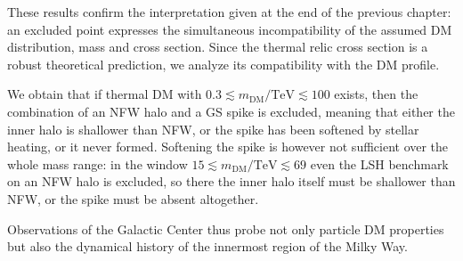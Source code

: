 These results confirm the interpretation given at the end of the previous
chapter: an excluded point expresses the simultaneous incompatibility of the assumed
DM distribution, mass and cross section. Since the thermal relic cross section
is a robust theoretical prediction, we analyze its compatibility 
with the DM profile. 

We obtain that if thermal DM with $0.3 \lesssim m_{\mathrm{DM}}/\mathrm{TeV}
\lesssim 100$ exists, then the combination of an NFW halo and a GS spike is
excluded, meaning that either the inner halo is shallower than NFW, or the spike
has been softened by stellar heating, or it never formed. Softening the spike is
however not sufficient over the whole mass range: in the window
$15 \lesssim m_{\mathrm{DM}}/\mathrm{TeV} \lesssim 69$ even the LSH benchmark on
an NFW halo is excluded, so there the inner halo itself must be shallower than
NFW, or the spike must be absent altogether.



Observations of the Galactic Center thus probe not only particle
DM properties but also the dynamical history of the innermost region of the
Milky Way.